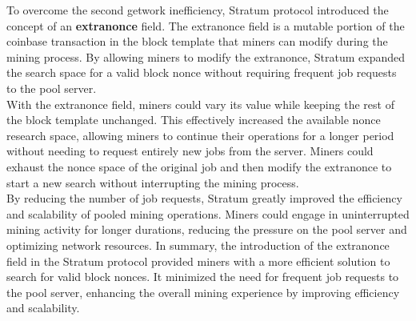 To overcome the second getwork inefficiency, Stratum protocol introduced the concept of an \textbf{extranonce} field. The extranonce field is a mutable portion of the coinbase transaction in the block template that miners can modify during the mining process. By allowing miners to modify the extranonce, Stratum expanded the search space for a valid block nonce without requiring frequent job requests to the pool server.\\
With the extranonce field, miners could vary its value while keeping the rest of the block template unchanged. This effectively increased the available nonce research space, allowing miners to continue their operations for a longer period without needing to request entirely new jobs from the server. Miners could exhaust the nonce space of the original job and then modify the extranonce to start a new search without interrupting the mining process.\\
By reducing the number of job requests, Stratum greatly improved the efficiency and scalability of pooled mining operations. Miners could engage in uninterrupted mining activity for longer durations, reducing the pressure on the pool server and optimizing network resources.
In summary, the introduction of the extranonce field in the Stratum protocol provided miners with a more efficient solution to search for valid block nonces. It minimized the need for frequent job requests to the pool server, enhancing the overall mining experience by improving efficiency and scalability.

